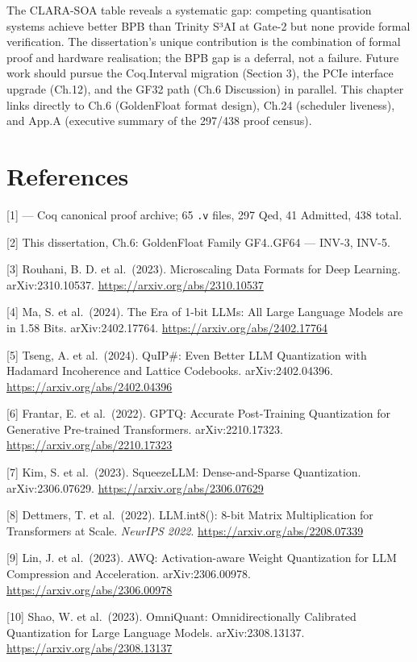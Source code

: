 The CLARA-SOA table reveals a systematic gap:
competing quantisation systems achieve better BPB
than Trinity S³AI at Gate-2 but none provide
formal verification. The dissertation's unique
contribution is the combination of formal proof
and hardware realisation; the BPB gap is a
deferral, not a failure. Future work should pursue
the Coq.Interval migration (Section 3), the PCIe
interface upgrade (Ch.12), and the GF32 path (Ch.6
Discussion) in parallel. This chapter links
directly to Ch.6 (GoldenFloat format design),
Ch.24 (scheduler liveness), and App.A (executive
summary of the 297/438 proof census).

\section{References}\label{fa_18:references}

[1] 
--- Coq canonical proof archive; 65 \texttt{.v}
files, 297 Qed, 41 Admitted, 438 total.

[2] This dissertation, Ch.6: GoldenFloat
Family GF4..GF64 --- INV-3, INV-5.

[3] Rouhani, B. D. et al.~(2023). Microscaling
Data Formats for Deep Learning. arXiv:2310.10537.
\url{https://arxiv.org/abs/2310.10537}

[4] Ma, S. et al.~(2024). The Era of 1-bit
LLMs: All Large Language Models are in 1.58 Bits.
arXiv:2402.17764. \url{https://arxiv.org/abs/2402.17764}

[5] Tseng, A. et al.~(2024). QuIP\#: Even
Better LLM Quantization with Hadamard Incoherence
and Lattice Codebooks. arXiv:2402.04396.
\url{https://arxiv.org/abs/2402.04396}

[6] Frantar, E. et al.~(2022). GPTQ: Accurate
Post-Training Quantization for Generative
Pre-trained Transformers. arXiv:2210.17323.
\url{https://arxiv.org/abs/2210.17323}

[7] Kim, S. et al.~(2023). SqueezeLLM:
Dense-and-Sparse Quantization. arXiv:2306.07629.
\url{https://arxiv.org/abs/2306.07629}

[8] Dettmers, T. et al.~(2022). LLM.int8():
8-bit Matrix Multiplication for Transformers at
Scale. \emph{NeurIPS 2022}.
\url{https://arxiv.org/abs/2208.07339}

[9] Lin, J. et al.~(2023). AWQ:
Activation-aware Weight Quantization for LLM
Compression and Acceleration. arXiv:2306.00978.
\url{https://arxiv.org/abs/2306.00978}

[10] Shao, W. et al.~(2023). OmniQuant:
Omnidirectionally Calibrated Quantization for
Large Language Models. arXiv:2308.13137.
\url{https://arxiv.org/abs/2308.13137}

